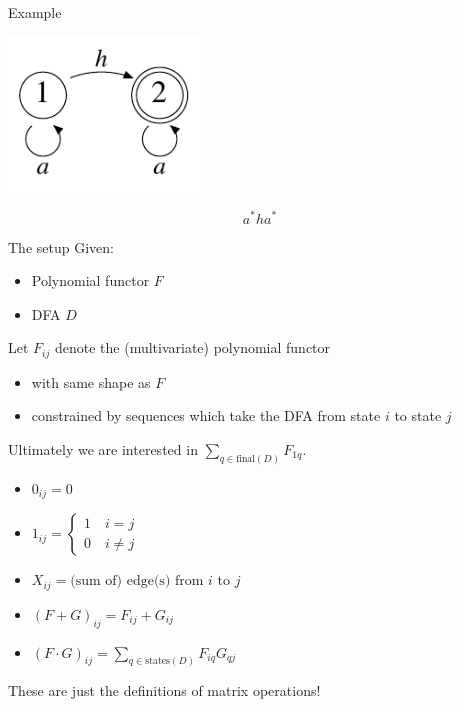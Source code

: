 \documentclass[xcolor=svgnames,12pt]{beamer}
\newenvironment{xframe}[1][]
  {\begin{frame}[fragile,environment=xframe,#1]}
  {\end{frame}}
\begin{document}
\begin{xframe}{Example}
  \begin{center}
    \includegraphics[width=2in]{deriv-DFA}

    \[ a^*ha^* \]
  \end{center}
\end{xframe}

\begin{xframe}{The setup}
  Given:
  \begin{itemize}
  \item Polynomial functor $F$
  \item DFA $D$
  \end{itemize} \medskip

  Let $F_{ij}$ denote the (multivariate) polynomial functor
  \begin{itemize}
    \item with same shape as $F$
    \item constrained by sequences which take the DFA from state $i$
      to state $j$
  \end{itemize} \medskip

  Ultimately we are interested in $\sum_{q \in \mathrm{final}(D)} F_{1q}$.
\end{xframe}


\begin{xframe}
  \begin{itemize}
  \item<+-> $0_{ij} = 0$
  \item<+-> $ 1_{ij} = \begin{cases} 1 \quad i = j \\ 0 \quad i \neq
      j \end{cases}$
  \item<+-> $X_{ij} = \text{(sum of) edge(s) from $i$ to $j$}$
  \item<+-> $(F + G)_{ij} = F_{ij} + G_{ij}$
  \item<+-> $(F \cdot G)_{ij} = \sum_{q \in \mathrm{states}(D)} F_{iq} G_{qj}$
  \end{itemize} \bigskip

   These are just the definitions of matrix operations!
\end{xframe}
\end{document}
